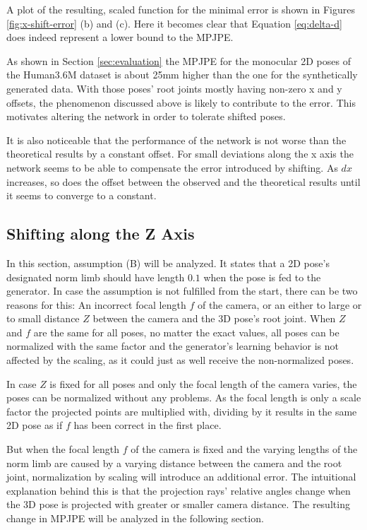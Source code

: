 
 
A plot of the resulting, scaled function for the minimal error is shown in Figures \ref{fig:x-shift-error} (b) and (c).
Here it becomes clear that Equation \eqref{eq:delta-d} does indeed represent a lower bound to the MPJPE.

As shown in Section \ref{sec:evaluation} the MPJPE for the monocular 2D poses of the Human3.6M dataset is about 25mm higher than the one for the synthetically generated data.
With those poses' root joints mostly having non-zero x and y offsets, the phenomenon discussed above is likely to contribute to the error.
This motivates altering the network in order to tolerate shifted poses.

It is also noticeable that the performance of the network is not worse than the theoretical results by a constant offset.
For small deviations along the x axis the network seems to be able to compensate the error introduced by shifting.
As $dx$ increases, so does the offset between the observed and the theoretical results until it seems to converge to a constant.

	
\subsection{Shifting along the Z Axis}
\label{sec:z-shift-error}

In this section, assumption (B) will be analyzed.
It states that a 2D pose's designated norm limb should have length $0.1$ when the pose is fed to the generator.
In case the assumption is not fulfilled from the start, there can be two reasons for this: 
An incorrect focal length $f$ of the camera, or an either to large or to small distance $Z$ between the camera and the 3D pose's root joint.
When $Z$ and $f$ are the same for all poses, no matter the exact values, all poses can be normalized with the same factor and the generator's learning behavior is not affected by the scaling, as it could just as well receive the non-normalized poses.

In case $Z$ is fixed for all poses and only the focal length of the camera varies, the poses can be normalized without any problems.
As the focal length is only a scale factor the projected points are multiplied with, dividing by it results in the same 2D pose as if $f$ has been correct in the first place.

But when the focal length $f$ of the camera is fixed and the varying lengths of the norm limb are caused by a varying distance between the camera and the root joint, normalization by scaling will introduce an additional error.
The intuitional explanation behind this is that the projection rays' relative angles change when the 3D pose is projected with greater or smaller camera distance.
The resulting change in MPJPE will be analyzed in the following section.

